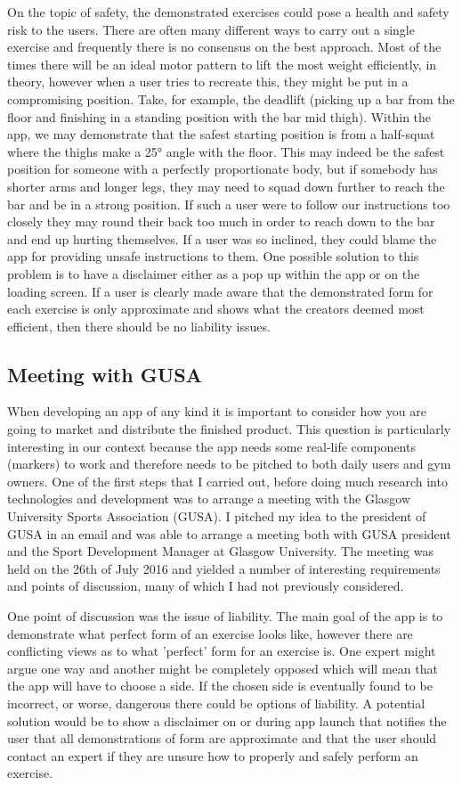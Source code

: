 \documentclass{l4proj}
\begin{document}
On the topic of safety, the demonstrated exercises could pose a health and safety risk to the users. There are often many different ways to carry out a single exercise and frequently there is no consensus on the best approach. Most of the times there will be an ideal motor pattern to lift the most weight efficiently, in theory, however when a user tries to recreate this, they might be put in a compromising position. Take, for example, the deadlift (picking up a bar from the floor and finishing in a standing position with the bar mid thigh). Within the app, we may demonstrate that the safest starting position is from a half-squat where the thighs make a 25° angle with the floor. This may indeed be the safest position for someone with a perfectly proportionate body, but if somebody has shorter arms and longer legs, they may need to squad down further to reach the bar and be in a strong position. If such a user were to follow our instructions too closely they may round their back too much in order to reach down to the bar and end up hurting themselves. If a user was so inclined, they could blame the app for providing unsafe instructions to them. One possible solution to this problem is to have a disclaimer either as a pop up within the app or on the loading screen. If a user is clearly made aware that the demonstrated form for each exercise is only approximate and shows what the creators deemed most efficient, then there should be no liability issues. 

\subsection{Meeting with GUSA}
When developing an app of any kind it is important to consider how you are going to market and distribute the finished product. This question is particularly interesting in our context because the app needs some real-life components (markers) to work and therefore needs to be pitched to both daily users and gym owners. One of the first steps that I carried out, before doing much research into technologies and development was to arrange a meeting with the Glasgow University Sports Association (GUSA). I pitched my idea to the president of GUSA in an email and was able to arrange a meeting both with GUSA president and the Sport Development Manager at Glasgow University. The meeting 	was held on the 26th of July 2016 and yielded a number of interesting requirements and points of discussion, many of which I had not previously considered. 

One point of discussion was the issue of liability. The main goal of the app is to demonstrate what perfect form of an exercise looks like, however there are conflicting views as to what 'perfect' form for an exercise is. One expert might argue one way and another might be completely opposed which will mean that the app will have to choose a side. If the chosen side is eventually found to be incorrect, or worse, dangerous there could be options of liability. A potential solution would be to show a disclaimer on or during app launch that notifies the user that all demonstrations of form are approximate and that the user should contact an expert if they are unsure how to properly and safely perform an exercise. 
\end{document}
